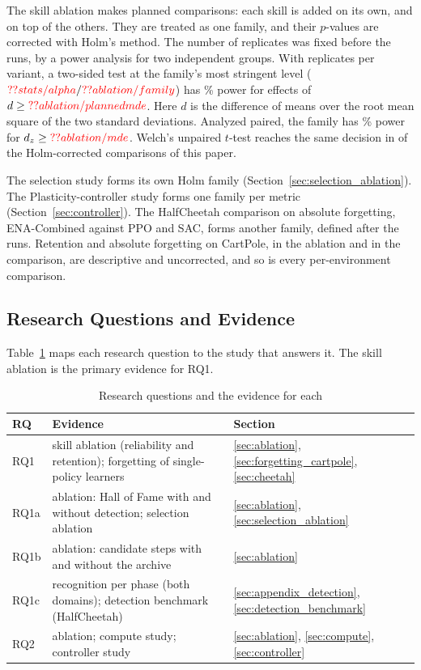 The skill ablation makes  planned comparisons: each skill is added on its own, and on top of the others. They are treated as one family, and their $p$-values are corrected with Holm's method. The number of replicates was fixed before the runs, by a power analysis for two independent groups. With  replicates per variant, a two-sided test at the family's most stringent level ($\Res{stats/alpha}/\Res{ablation/family}$) has \% power for effects of $d \ge \Res{ablation/plannedmde}$. Here $d$ is the difference of means over the root mean square of the two standard deviations. Analyzed paired, the family has \% power for $d_z \ge \Res{ablation/mde}$. Welch's unpaired $t$-test reaches the same decision in  of the  Holm-corrected comparisons of this paper.

The selection study forms its own Holm family (Section~\ref{sec:selection_ablation}). The Plasticity-controller study forms one family per metric (Section~\ref{sec:controller}). The HalfCheetah comparison on absolute forgetting, ENA-Combined against PPO and SAC, forms another family, defined after the runs. Retention and absolute forgetting on CartPole, in the ablation and in the comparison, are descriptive and uncorrected, and so is every per-environment comparison.

\subsection{Research Questions and Evidence}
Table~\ref{tab:rq_map} maps each research question to the study that answers it. The skill ablation is the primary evidence for RQ1.

\begin{table}[htbp]
\caption{Research questions and the evidence for each}
\begin{center}
\footnotesize
\setlength{\tabcolsep}{3pt}
\begin{tabular}{|l|p{}|l|}
\hline
\textbf{RQ} & \textbf{Evidence} & \textbf{Section} \\
\hline
RQ1 & skill ablation (reliability and retention); forgetting of single-policy learners & \ref{sec:ablation}, \ref{sec:forgetting_cartpole}, \ref{sec:cheetah} \\
RQ1a & ablation: Hall of Fame with and without detection; selection ablation & \ref{sec:ablation}, \ref{sec:selection_ablation} \\
RQ1b & ablation: candidate steps with and without the archive & \ref{sec:ablation} \\
RQ1c & recognition per phase (both domains); detection benchmark (HalfCheetah) & \ref{sec:appendix_detection}, \ref{sec:detection_benchmark} \\
RQ2 & ablation; compute study; controller study & \ref{sec:ablation}, \ref{sec:compute}, \ref{sec:controller} \\
\hline
\end{tabular}
\label{tab:rq_map}
\end{center}
\end{table}
